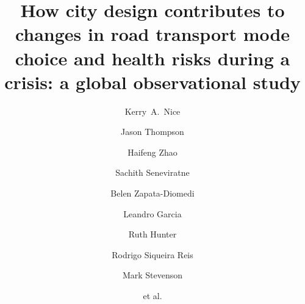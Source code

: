 \documentclass[preprint,12pt]{elsarticle}
\begin{document}
\begin{frontmatter}



\title{How city design contributes to changes in road transport mode choice and health risks during a crisis: a global observational study}


\author[melb]{Kerry~A.~Nice}
\author[melb]{Jason Thompson}
\author[melb]{Haifeng Zhao}
\author[melb]{Sachith Seneviratne}
\author[RMII]{Belen Zapata-Diomedi}
\author[Belfast]{Leandro Garcia}
\author[Belfast]{Ruth Hunter}
\author[wash]{Rodrigo Siqueira Reis}
\author[melb,eng]{Mark Stevenson}
\author[melb]{et al.}

\address[melb]{Transport, Health, and Urban Systems Research Lab, Faculty of Architecture, Building, and Planning, University of Melbourne, VIC, Australia.}
\address[RMII]{Healthy Liveable Cities Lab, Centre for Urban Research, RMIT University, Melbourne, Australia.}
\address[Belfast]{Centre for Public Health, Queen’s University Belfast, Institute of Clinical Sciences B, Belfast, Northern Ireland, UK.}
\address[wash]{Washington University, St. Louis, Missouri, US.}
\address[eng]{Melbourne School of Engineering; and Melbourne School of Population and Global Health, University of Melbourne, VIC, Australia.}


\end{frontmatter}
\end{document}
